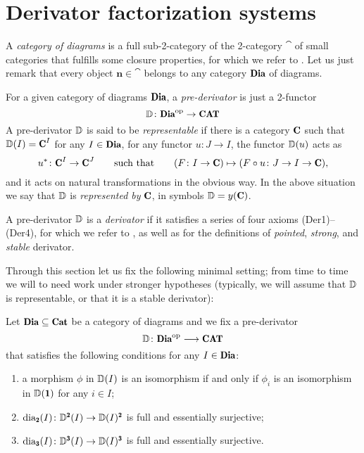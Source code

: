 \section{Derivator factorization systems}\label{sec:squaring}

A {\em category of diagrams} is a full sub-2-category of the 2-category $\cat$ of small categories  that fulfills some closure properties, for which we refer to \cite[\adef\textbf{4.21}]{Moritz}. Let us just remark that every object $\mathbf{n}\in\cat$ belongs to any category $\Dia$ of diagrams.

For a given category of diagrams $\Dia$, a {\em pre-derivator} is just a 2-functor
\[
\D\colon \Dia^\opp\to \Cat
\]
A pre-derivator $\mathbb{D}$ is said to be {\em representable} if there is a category $\C$ such that $\D(I)=\C^{I}$ for any $I\in \Dia$, for any functor $u\colon J\to I$, the functor $\mathbb{D}(u)$ acts as 
\[
u^*\colon \C^I\to \C^J\qquad\text{such that}\qquad ( F\colon I\to \C)\mapsto (F\circ u\colon J\to I\to \C),
\]
and it acts on natural transformations in the obvious way. In the above situation we say that $\mathbb{D}$ is {\em represented by} $\C$, in symbols $\D=y(\C)$.

A pre-derivator $\mathbb{D}$ is a {\em derivator} if it satisfies a series of four axioms (Der1)--(Der4), for which we refer to \cite{Moritz}, as well as for the definitions of {\em pointed}, {\em strong}, and {\em stable} derivator. 

\medskip
Through this section let us fix the following minimal setting; from time to time we will to need work under stronger hypotheses (typically, we will assume that $\mathbb{D}$ is representable, or that it is a stable derivator):

\begin{setting}\label{setting_sec_3} 
Let $\Dia\subseteq \cat$ be a category of diagrams and we fix a pre-derivator
\[
\D\colon \Dia^\opp\longrightarrow \Cat
\]
that satisfies the following conditions for any $I\in \Dia$:
\begin{enumerate}
\item a morphism $\phi$ in $\mathbb{D}(I)$ is an isomorphism if and only if $\phi_i$ is an isomorphism in $\D(\uno)$ for any $i\in I$;
\item $\dia_\due(I)\colon \D^\due(I)\to \D(I)^\due$ is full and essentially surjective;
\item $\dia_\tre(I)\colon \D^\tre(I)\to \D(I)^\tre$ is full and essentially surjective.
\end{enumerate}
\end{setting}


